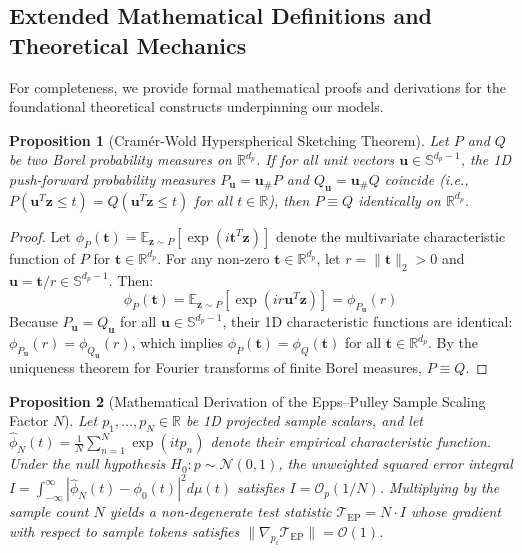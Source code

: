 \documentclass{article}
\newtheorem{proposition}{Proposition}
\begin{document}
\subsection{Extended Mathematical Definitions and Theoretical Mechanics}

For completeness, we provide formal mathematical proofs and derivations for the foundational theoretical constructs underpinning our models.

\begin{proposition}[Cram\'er-Wold Hyperspherical Sketching Theorem]
\label{prop:cramer_wold}
Let $P$ and $Q$ be two Borel probability measures on $\mathbb{R}^{d_p}$. If for all unit vectors $\mathbf{u} \in \mathbb{S}^{d_p - 1}$, the 1D push-forward probability measures $P_{\mathbf{u}} = \mathbf{u}_\# P$ and $Q_{\mathbf{u}} = \mathbf{u}_\# Q$ coincide (i.e., $P(\mathbf{u}^T \mathbf{z} \le t) = Q(\mathbf{u}^T \mathbf{z} \le t)$ for all $t \in \mathbb{R}$), then $P \equiv Q$ identically on $\mathbb{R}^{d_p}$.
\end{proposition}

\begin{proof}
Let $\phi_P(\mathbf{t}) = \mathbb{E}_{\mathbf{z} \sim P}[\exp(i \mathbf{t}^T \mathbf{z})]$ denote the multivariate characteristic function of $P$ for $\mathbf{t} \in \mathbb{R}^{d_p}$. For any non-zero $\mathbf{t} \in \mathbb{R}^{d_p}$, let $r = \|\mathbf{t}\|_2 > 0$ and $\mathbf{u} = \mathbf{t} / r \in \mathbb{S}^{d_p - 1}$. Then:
\begin{equation}
    \phi_P(\mathbf{t}) = \mathbb{E}_{\mathbf{z} \sim P}[\exp(i r \mathbf{u}^T \mathbf{z})] = \phi_{P_{\mathbf{u}}}(r)
\end{equation}
Because $P_{\mathbf{u}} = Q_{\mathbf{u}}$ for all $\mathbf{u} \in \mathbb{S}^{d_p - 1}$, their 1D characteristic functions are identical: $\phi_{P_{\mathbf{u}}}(r) = \phi_{Q_{\mathbf{u}}}(r)$, which implies $\phi_P(\mathbf{t}) = \phi_Q(\mathbf{t})$ for all $\mathbf{t} \in \mathbb{R}^{d_p}$. By the uniqueness theorem for Fourier transforms of finite Borel measures, $P \equiv Q$.
\end{proof}

\begin{proposition}[Mathematical Derivation of the Epps--Pulley Sample Scaling Factor $N$]
\label{prop:epps_pulley_scaling}
Let $p_1, \dots, p_N \in \mathbb{R}$ be 1D projected sample scalars, and let $\hat{\phi}_N(t) = \frac{1}{N} \sum_{n=1}^N \exp(i t p_n)$ denote their empirical characteristic function. Under the null hypothesis $H_0: p \sim \mathcal{N}(0, 1)$, the unweighted squared error integral $I = \int_{-\infty}^\infty |\hat{\phi}_N(t) - \phi_0(t)|^2 d\mu(t)$ satisfies $I = \mathcal{O}_p(1/N)$. Multiplying by the sample count $N$ yields a non-degenerate test statistic $\mathcal{T}_{\text{EP}} = N \cdot I$ whose gradient with respect to sample tokens satisfies $\|\nabla_{p_i} \mathcal{T}_{\text{EP}}\| = \mathcal{O}(1)$.
\end{proposition}
\end{document}
